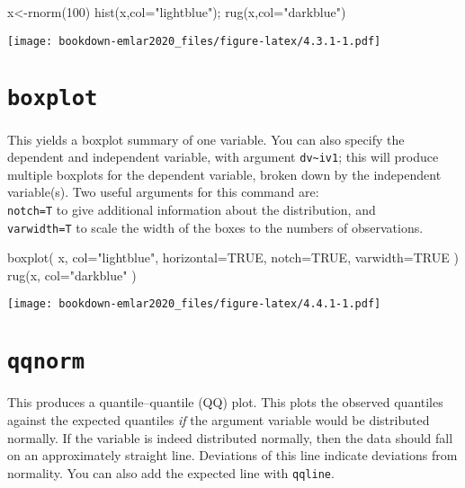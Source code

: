 \documentclass[
]{book}
\newenvironment{Shaded}{\begin{snugshade}}{\end{snugshade}}
\newcommand{\AttributeTok}[1]{\textcolor[rgb]{0.77,0.63,0.00}{#1}}
\newcommand{\ConstantTok}[1]{\textcolor[rgb]{0.00,0.00,0.00}{#1}}
\newcommand{\DecValTok}[1]{\textcolor[rgb]{0.00,0.00,0.81}{#1}}
\newcommand{\FunctionTok}[1]{\textcolor[rgb]{0.00,0.00,0.00}{#1}}
\newcommand{\NormalTok}[1]{#1}
\newcommand{\OtherTok}[1]{\textcolor[rgb]{0.56,0.35,0.01}{#1}}
\newcommand{\StringTok}[1]{\textcolor[rgb]{0.31,0.60,0.02}{#1}}
\begin{document}
\begin{Shaded}
\begin{Highlighting}[]
\NormalTok{x}\OtherTok{\textless{}{-}}\FunctionTok{rnorm}\NormalTok{(}\DecValTok{100}\NormalTok{) }
\FunctionTok{hist}\NormalTok{(x,}\AttributeTok{col=}\StringTok{"lightblue"}\NormalTok{); }\FunctionTok{rug}\NormalTok{(x,}\AttributeTok{col=}\StringTok{"darkblue"}\NormalTok{)}
\end{Highlighting}
\end{Shaded}

\texttt{[image: bookdown-emlar2020\_files/figure-latex/4.3.1-1.pdf]}

\hypertarget{boxplot}{%
\section{\texorpdfstring{\texttt{boxplot}}{boxplot}}\label{boxplot}}

This yields a
boxplot summary \citep{tukey77} of one variable. You can also specify the
dependent and independent variable, with argument
\texttt{dv\textasciitilde{}iv1}; this will produce multiple
boxplots for the dependent variable, broken down by the independent
variable(s).
Two useful arguments for this command are:\\
\texttt{notch=T} to give additional information
about the distribution, and\\
\texttt{varwidth=T} to scale the width of the boxes
to the numbers of observations.

\begin{Shaded}
\begin{Highlighting}[]
\FunctionTok{boxplot}\NormalTok{( x, }\AttributeTok{col=}\StringTok{"lightblue"}\NormalTok{, }\AttributeTok{horizontal=}\ConstantTok{TRUE}\NormalTok{, }\AttributeTok{notch=}\ConstantTok{TRUE}\NormalTok{, }\AttributeTok{varwidth=}\ConstantTok{TRUE}\NormalTok{ )}
\FunctionTok{rug}\NormalTok{(x, }\AttributeTok{col=}\StringTok{"darkblue"}\NormalTok{ )}
\end{Highlighting}
\end{Shaded}

\texttt{[image: bookdown-emlar2020\_files/figure-latex/4.4.1-1.pdf]}

\hypertarget{qqnorm}{%
\section{\texorpdfstring{\texttt{qqnorm}}{qqnorm}}\label{qqnorm}}

This produces a quantile--quantile (QQ) plot. This plots the
observed quantiles against the expected quantiles \emph{if} the argument
variable would be distributed normally. If the variable is indeed
distributed normally, then the data should fall on an approximately
straight line. Deviations of this line indicate deviations from
normality. You can also add the expected line with
\texttt{qqline}.
\end{document}
